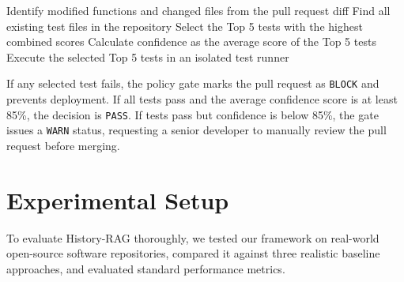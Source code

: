 \documentclass[12pt,onecolumn,draftclsnofoot]{IEEEtran}
\begin{document}
\begin{algorithm}[t]
\caption{History-RAG Test Selection and Policy Gating}
\label{algo:rts}
Identify modified functions and changed files from the pull request diff\;
Find all existing test files in the repository\;
Select the Top 5 tests with the highest combined scores\;
Calculate confidence as the average score of the Top 5 tests\;
Execute the selected Top 5 tests in an isolated test runner\;
\end{algorithm}

If any selected test fails, the policy gate marks the pull request as \texttt{BLOCK} and prevents deployment. If all tests pass and the average confidence score is at least 85\%, the decision is \texttt{PASS}. If tests pass but confidence is below 85\%, the gate issues a \texttt{WARN} status, requesting a senior developer to manually review the pull request before merging.

\section{Experimental Setup}
\label{sec:setup}
To evaluate History-RAG thoroughly, we tested our framework on real-world open-source software repositories, compared it against three realistic baseline approaches, and evaluated standard performance metrics.
\end{document}
